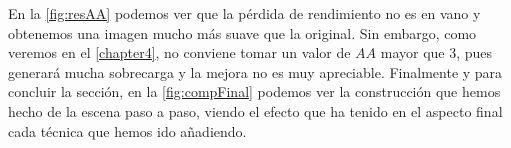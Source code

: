 En la \autoref{fig:resAA} podemos ver que la pérdida de rendimiento no es en vano y obtenemos una imagen mucho más suave que la original. Sin embargo, como veremos en el \autoref{chapter4}, no conviene tomar un valor de $AA$ mayor que $3$, pues generará mucha sobrecarga y la mejora no es muy apreciable. Finalmente y para concluir la sección, en la \autoref{fig:compFinal} podemos ver la construcción que hemos hecho de la escena paso a paso, viendo el efecto que ha tenido en el aspecto final cada técnica que hemos ido añadiendo.

